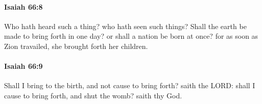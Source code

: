 		\paragraph{Isaiah 66:8} %
			\label{ISAIAH-66-8}

			Who hath heard such a thing? who hath seen such things? Shall the earth be made to bring forth in one day? or shall a nation be born at once? for as soon as Zion travailed, she brought forth her children.


		\paragraph{Isaiah 66:9} %
			\label{ISAIAH-66-9}

			Shall I bring to the birth, and not cause to bring forth? saith the LORD: shall I cause to bring forth, and shut the womb? saith thy God.


